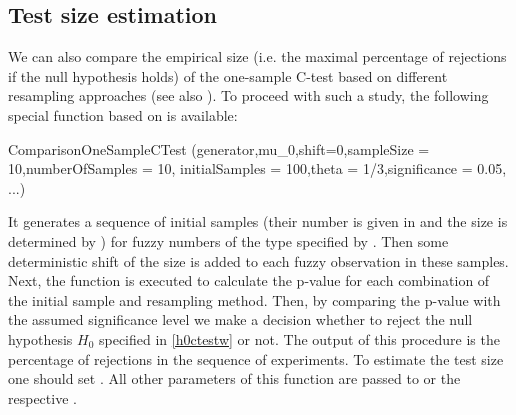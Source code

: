 

\subsection{Test size estimation}

We can also compare the empirical size (i.e. the maximal percentage of rejections if the null hypothesis holds) of the one-sample C-test based on different resampling approaches (see also \cite{grzegorzewski_ijcis2020}). To proceed with such a study, the following special function based on  is available:
\begin{example}
ComparisonOneSampleCTest (generator,mu_0,shift=0,sampleSize = 10,numberOfSamples = 10,
 initialSamples = 100,theta = 1/3,significance = 0.05, ...)
\end{example}
It generates a sequence of initial samples (their number is given in  and the size is determined by ) for fuzzy numbers of the type specified by . Then some deterministic shift of the size  is added to each fuzzy observation in these samples.
Next, the function  is executed to calculate the p-value for each combination of the initial sample and  resampling method. Then, by comparing the p-value with the assumed significance level
 we make a decision whether to reject the null hypothesis $H_0$ specified in \eqref{h0ctestw} or not.
The output of this procedure is the percentage of rejections in the sequence of experiments.
To estimate the test size one should set . All other parameters of this function are passed to  or the respective .

